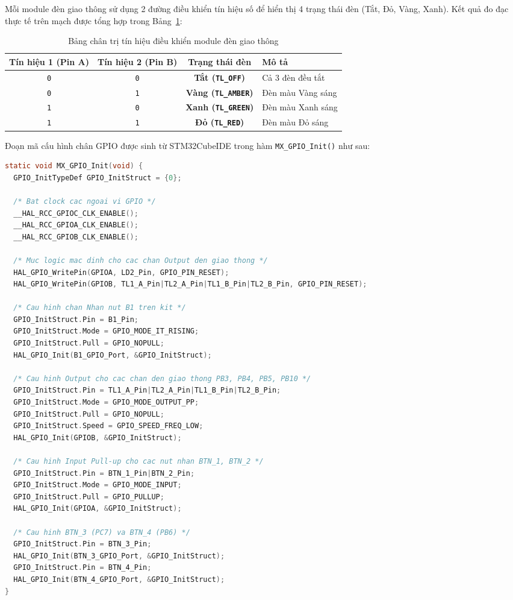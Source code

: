 Mỗi module đèn giao thông sử dụng 2 đường điều khiển tín hiệu số để hiển thị 4 trạng thái đèn (Tắt, Đỏ, Vàng, Xanh). Kết quả đo đạc thực tế trên mạch được tổng hợp trong Bảng~\ref{tab:traffic_truth_table}:

\begin{table}[H]
\centering
\begin{tabular}{|c|c|c|l|}
\hline
\textbf{Tín hiệu 1 (Pin A)} & \textbf{Tín hiệu 2 (Pin B)} & \textbf{Trạng thái đèn} & \textbf{Mô tả} \\ \hline
\texttt{0} & \texttt{0} & \textbf{Tắt (\texttt{TL\_OFF})} & Cả 3 đèn đều tắt \\ \hline
\texttt{0} & \texttt{1} & \textbf{Vàng (\texttt{TL\_AMBER})} & Đèn màu Vàng sáng \\ \hline
\texttt{1} & \texttt{0} & \textbf{Xanh (\texttt{TL\_GREEN})} & Đèn màu Xanh sáng \\ \hline
\texttt{1} & \texttt{1} & \textbf{Đỏ (\texttt{TL\_RED})} & Đèn màu Đỏ sáng \\ \hline
\end{tabular}
\caption{Bảng chân trị tín hiệu điều khiển module đèn giao thông}
\label{tab:traffic_truth_table}
\end{table}

Đoạn mã cấu hình chân GPIO được sinh từ STM32CubeIDE trong hàm \texttt{MX\_GPIO\_Init()} như sau:
\begin{lstlisting}[language=C, caption={Trích đoạn cấu hình GPIO trong file main.c}]
static void MX_GPIO_Init(void) {
  GPIO_InitTypeDef GPIO_InitStruct = {0};

  /* Bat clock cac ngoai vi GPIO */
  __HAL_RCC_GPIOC_CLK_ENABLE();
  __HAL_RCC_GPIOA_CLK_ENABLE();
  __HAL_RCC_GPIOB_CLK_ENABLE();

  /* Muc logic mac dinh cho cac chan Output den giao thong */
  HAL_GPIO_WritePin(GPIOA, LD2_Pin, GPIO_PIN_RESET);
  HAL_GPIO_WritePin(GPIOB, TL1_A_Pin|TL2_A_Pin|TL1_B_Pin|TL2_B_Pin, GPIO_PIN_RESET);

  /* Cau hinh chan Nhan nut B1 tren kit */
  GPIO_InitStruct.Pin = B1_Pin;
  GPIO_InitStruct.Mode = GPIO_MODE_IT_RISING;
  GPIO_InitStruct.Pull = GPIO_NOPULL;
  HAL_GPIO_Init(B1_GPIO_Port, &GPIO_InitStruct);

  /* Cau hinh Output cho cac chan den giao thong PB3, PB4, PB5, PB10 */
  GPIO_InitStruct.Pin = TL1_A_Pin|TL2_A_Pin|TL1_B_Pin|TL2_B_Pin;
  GPIO_InitStruct.Mode = GPIO_MODE_OUTPUT_PP;
  GPIO_InitStruct.Pull = GPIO_NOPULL;
  GPIO_InitStruct.Speed = GPIO_SPEED_FREQ_LOW;
  HAL_GPIO_Init(GPIOB, &GPIO_InitStruct);

  /* Cau hinh Input Pull-up cho cac nut nhan BTN_1, BTN_2 */
  GPIO_InitStruct.Pin = BTN_1_Pin|BTN_2_Pin;
  GPIO_InitStruct.Mode = GPIO_MODE_INPUT;
  GPIO_InitStruct.Pull = GPIO_PULLUP;
  HAL_GPIO_Init(GPIOA, &GPIO_InitStruct);

  /* Cau hinh BTN_3 (PC7) va BTN_4 (PB6) */
  GPIO_InitStruct.Pin = BTN_3_Pin;
  HAL_GPIO_Init(BTN_3_GPIO_Port, &GPIO_InitStruct);
  GPIO_InitStruct.Pin = BTN_4_Pin;
  HAL_GPIO_Init(BTN_4_GPIO_Port, &GPIO_InitStruct);
}
\end{lstlisting}


